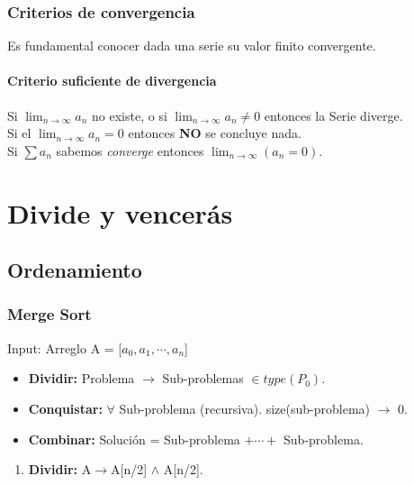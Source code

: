 \documentclass[tikz,11pt,fleqn]{book} %
\begin{document}
\subsection{Criterios de convergencia}
Es fundamental conocer dada una serie su valor finito convergente.
\subsubsection{Criterio suficiente de divergencia}
Si $\lim_{n\to\infty}a_n$ no existe, o si $\lim_{n\to\infty}a_n\ne0$ entonces la Serie diverge.
~\\
Si el $\lim_{n\to\infty}a_n=0$ entonces \textbf{NO} se concluye nada.
~\\
Si $\sum a_n$ sabemos \textit{converge} entonces $\lim_{n\to\infty}(a_n=0)$.



\chapter{Divide y vencerás}
\section{Ordenamiento}

\subsection{Merge Sort}

Input: Arreglo A = [$a_0, a_1,\cdots,a_n$]

\begin{definition}[Paradigma] 
    \begin{itemize}
    Resolución DyV:
        \item \textbf{Dividir:} Problema $\to$ Sub-problemas $\in type(P_0)$.
        \item \textbf{Conquistar:} $\forall$ Sub-problema (recursiva). size(sub-problema) $\to$ 0.
        \item \textbf{Combinar:} Solución = Sub-problema $+\cdots+$ Sub-problema.
    \end{itemize}
\end{definition}

\begin{example}
    \begin{enumerate}
        \item \textbf{Dividir:} A$\to$A[n/2] $\land$ A[n/2].
    \end{enumerate}
\end{example}
\end{document}
